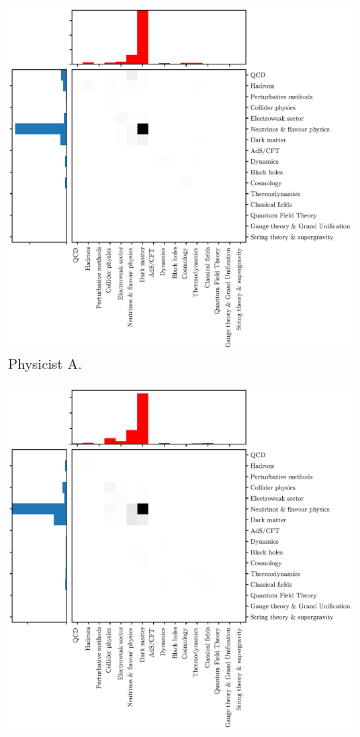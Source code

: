 \documentclass{article}
\begin{document}
\begin{figure}[h]
\begin{subfigure}{.45\textwidth}
    \includegraphics[width=1.15\textwidth]{plots/Fig4a.eps}
    \caption{Physicist A. %
    }
    \label{fig:S.Ando.1}
\end{subfigure}\hfill%
\begin{subfigure}{0.45\textwidth}
    \includegraphics[width=1.15\textwidth]{plots/Fig4b.eps}

\end{subfigure}
\end{figure}
\end{document}
